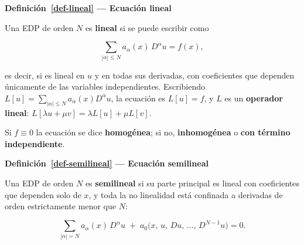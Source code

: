 \documentclass[
  spanish,
  a4paper,
]{scrbook}
\theoremstyle{definition}
\theoremstyle{plain}
\theoremstyle{definition}
\theoremstyle{plain}
\theoremstyle{definition}
\theoremstyle{remark}
\begin{document}
\begin{tcolorbox}[enhanced jigsaw, arc=.35mm, bottomrule=.15mm, breakable, colback=white, colframe=quarto-callout-note-color-frame, left=2mm, leftrule=.75mm, opacityback=0, rightrule=.15mm, toprule=.15mm]
\begin{minipage}[t]{5.5mm}
\textcolor{quarto-callout-note-color}{\faInfo}
\end{minipage}%
\begin{minipage}[t]{\textwidth - 5.5mm}

\vspace{-3mm}\textbf{Definición~\ref{def-lineal} --- Ecuación lineal}\vspace{3mm}

Una EDP de orden \(N\) es \textbf{lineal} si se puede escribir como

\[
\sum_{|\alpha| \le N} a_\alpha(x)\, D^\alpha u = f(x),
\]

es decir, si es lineal en \(u\) y en todas sus derivadas, con
coeficientes que dependen únicamente de las variables independientes.
Escribiendo \(L[u] = \sum_{|\alpha|\le N} a_\alpha(x)D^\alpha u\), la
ecuación es \(L[u] = f\), y \(L\) es un \textbf{operador lineal}:
\(L[\lambda u + \mu v] = \lambda L[u] + \mu L[v]\).

Si \(f \equiv 0\) la ecuación se dice \textbf{homogénea}; si no,
\textbf{inhomogénea} o \textbf{con término independiente}.

\end{minipage}%
\end{tcolorbox}

\begin{tcolorbox}[enhanced jigsaw, arc=.35mm, bottomrule=.15mm, breakable, colback=white, colframe=quarto-callout-note-color-frame, left=2mm, leftrule=.75mm, opacityback=0, rightrule=.15mm, toprule=.15mm]
\begin{minipage}[t]{5.5mm}
\textcolor{quarto-callout-note-color}{\faInfo}
\end{minipage}%
\begin{minipage}[t]{\textwidth - 5.5mm}

\vspace{-3mm}\textbf{Definición~\ref{def-semilineal} --- Ecuación semilineal}\vspace{3mm}

Una EDP de orden \(N\) es \textbf{semilineal} si su parte principal es
lineal con coeficientes que dependen solo de \(x\), y toda la no
linealidad está confinada a derivadas de orden estrictamente menor que
\(N\):

\[
\sum_{|\alpha| = N} a_\alpha(x)\, D^\alpha u \;+\; a_0\big(x,\,u,\,Du,\,\dots,\,D^{N-1}u\big) = 0 .
\]

\end{minipage}%
\end{tcolorbox}
\end{document}
